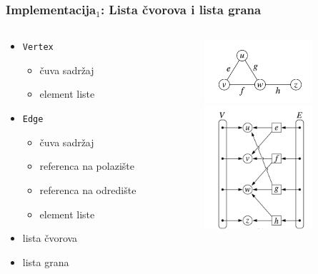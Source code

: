 \documentclass[compress]{beamer}
\begin{document}
\begin{frame}[fragile]
  \frametitle{Implementacija$_1$: Lista čvorova i lista grana}
  \begin{columns}
    \begin{column}[t]{6cm}
      \begin{itemize}
        \item \texttt{Vertex}
        \begin{itemize}
          \item čuva sadržaj
          \item element liste
        \end{itemize}
        \item \texttt{Edge}
        \begin{itemize}
          \item čuva sadržaj
          \item referenca na polazište
          \item referenca na odredište
          \item element liste
        \end{itemize}
        \item lista čvorova
        \item lista grana
      \end{itemize}
    \end{column}
    \begin{column}[t]{6cm}
      \begin{center}
        \includegraphics[width=4cm]{asp-14-pic08.png} \\
        \includegraphics[width=4cm]{asp-14-pic09.png}
      \end{center}
    \end{column}
  \end{columns}
\end{frame}
\end{document}
